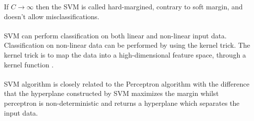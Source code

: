 If $C \rightarrow \infty$ then the SVM is called hard-margined, contrary to soft margin, and doesn't allow misclassifications.
\\\\
SVM can perform classification on both linear and non-linear input data. Classification on non-linear data can be performed by using the kernel trick. The kernel trick is to map the data into a high-dimensional feature space, through a kernel function \citep{svm_ai}.
\\\\
SVM algorithm is closely related to the Perceptron algorithm with the difference that the hyperplane constructed by SVM maximizes the margin whilst perceptron is non-deterministic and returns a hyperplane which separates the input data.
